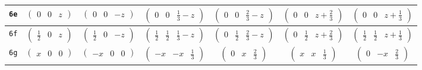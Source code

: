 \documentclass[fleqn,9pt,landscape]{jsarticle}
\begin{document}
\begin{center}
\begin{longtable}{ccccccc}
{\tt 6e} & $ \begin{pmatrix} 0 & 0 & z \end{pmatrix} $ & $ \begin{pmatrix} 0 & 0 & - z \end{pmatrix} $ & $ \begin{pmatrix} 0 & 0 & \frac{1}{3} - z \end{pmatrix} $ & $ \begin{pmatrix} 0 & 0 & \frac{2}{3} - z \end{pmatrix} $ & $ \begin{pmatrix} 0 & 0 & z + \frac{2}{3} \end{pmatrix} $ & $ \begin{pmatrix} 0 & 0 & z + \frac{1}{3} \end{pmatrix} $ \\ \hline
{\tt 6f} & $ \begin{pmatrix} \frac{1}{2} & 0 & z \end{pmatrix} $ & $ \begin{pmatrix} \frac{1}{2} & 0 & - z \end{pmatrix} $ & $ \begin{pmatrix} \frac{1}{2} & \frac{1}{2} & \frac{1}{3} - z \end{pmatrix} $ & $ \begin{pmatrix} 0 & \frac{1}{2} & \frac{2}{3} - z \end{pmatrix} $ & $ \begin{pmatrix} 0 & \frac{1}{2} & z + \frac{2}{3} \end{pmatrix} $ & $ \begin{pmatrix} \frac{1}{2} & \frac{1}{2} & z + \frac{1}{3} \end{pmatrix} $ \\ \hline
{\tt 6g} & $ \begin{pmatrix} x & 0 & 0 \end{pmatrix} $ & $ \begin{pmatrix} - x & 0 & 0 \end{pmatrix} $ & $ \begin{pmatrix} - x & - x & \frac{1}{3} \end{pmatrix} $ & $ \begin{pmatrix} 0 & x & \frac{2}{3} \end{pmatrix} $ & $ \begin{pmatrix} x & x & \frac{1}{3} \end{pmatrix} $ & $ \begin{pmatrix} 0 & - x & \frac{2}{3} \end{pmatrix} $ \\ \hline

\end{longtable}
\end{center}
\end{document}

